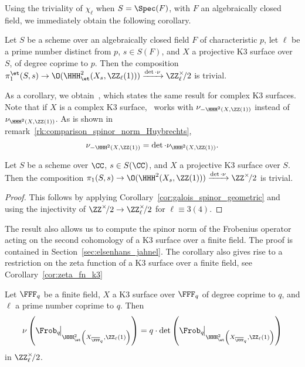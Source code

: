 Using the triviality of $\chi_{\ell}$ when $S = \Spec(F)$, with $F$ an algebraically closed field, we immediately obtain the following corollary.
\begin{corollary}\label{cor:galois_spinor_geometric}
Let $S$ be a scheme over an algebraically closed field $F$ of characteristic $p$, let $\ell$ be a prime number distinct from $p$, $s \in S(F)$, and $X$ a projective K3 surface over $S$, of degree coprime to $p$. Then the composition $\pi^{\et}_1(S,s) \rightarrow \O(\HHH_{\et}^2(X_s,\ZZ_{\ell}(1))) \xrightarrow{\det \cdot \nu} \ZZ_{\ell}^{\times}\!/2$ is trivial.
\end{corollary}
As a corollary, we obtain~\cite[Proposition~7.5.5]{HuybrechtsK3}, which states the same result for complex K3 surfaces. Note that if $X$ is a complex K3 surface,~\cite{HuybrechtsK3} works with $\nu_{-\HHH^2(X,\ZZ(1))}$ instead of $\nu_{\HHH^2(X,\ZZ(1))}$. As is shown in remark~\ref{rk:comparison_spinor_norm_Huybrechts},
$$
\nu_{-\HHH^2(X,\ZZ(1))} = \det \cdot \nu_{\HHH^2(X,\ZZ(1))}.
$$

\begin{corollary}
    Let $S$ be a scheme over $\CC$, $s \in S(\CC)$, and $X$ a projective K3 surface over $S$. Then the composition $\pi_1(S,s) \rightarrow \O(\HHH^2(X_s,\ZZ(1))) \xrightarrow{\det \cdot \nu} \ZZ^{\times}\!/2$ is trivial.
\end{corollary}
\begin{proof}
    This follows by applying Corollary~\ref{cor:galois_spinor_geometric} and using the injectivity of $\ZZ^{\times}\!/2 \rightarrow \ZZ_{\ell}^{\times}\!/2$ for $\ell \equiv 3 (4)$.
\end{proof}

The result also allows us to compute the spinor norm of the Frobenius operator acting on the second cohomology of a K3 surface over a finite field. The proof is contained in Section~\ref{sec:elsenhans_jahnel}. The corollary also gives rise to a restriction on the zeta function of a K3 surface over a finite field, see Corollary~\ref{cor:zeta_fn_k3}
\begin{corollary}\label{cor:spinor_frobenius}
Let $\FFF_{q}$ be a finite field, $X$ a K3 surface over $\FFF_q$ of degree coprime to $q$, and $\ell$ a prime number coprime to $q$. Then
$$
 \nu\left(\Frob_q\!\big|_{\HHH^2_{\et}\left(X_{\overline{\FFF}_q},\ZZ_{\ell}(1)\right)}\right) = q \cdot \det\left(\Frob_q\!\big|_{\HHH^2_{\et}\left(X_{\overline{\FFF}_q},\ZZ_{\ell}(1)\right)}\right)
$$
    in $\ZZ_{\ell}^{\times}\!/2$.
\end{corollary}

